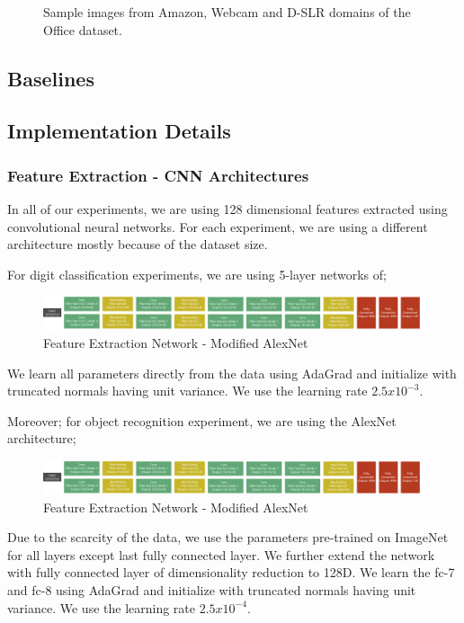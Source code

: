 \begin{figure}
\caption{Sample images from Amazon, Webcam and D-SLR domains of the Office dataset.}
\end{figure}


\subsection{Baselines}
\subsection{Implementation Details}
\subsubsection{Feature Extraction - CNN Architectures}
In all of our experiments, we are using 128 dimensional features extracted using convolutional neural networks. For each experiment, we are using a different architecture mostly because of the dataset size.


For digit classification experiments, we are using 5-layer networks of;
\begin{figure}[h]
\includegraphics[width=\columnwidth]{alexnet}
\caption{Feature Extraction Network - Modified AlexNet}
\end{figure}
We learn all parameters directly from the data using AdaGrad\cite{adagrad} and initialize with truncated normals having unit variance. We use the learning rate $2.5x10^{-3}$.

Moreover; for object recognition experiment, we are using the AlexNet architecture\cite{alexnet};
\begin{figure}[h]
\includegraphics[width=\columnwidth]{alexnet}
\caption{Feature Extraction Network - Modified AlexNet}
\end{figure}
Due to the scarcity of the data, we use the parameters pre-trained on ImageNet for all layers except  last fully connected layer. We further extend the network with fully connected layer of dimensionality reduction to 128D. We learn the fc-7 and fc-8 using AdaGrad\cite{adagrad} and initialize with truncated normals having unit variance. We use the learning rate $2.5x10^{-4}$. 


